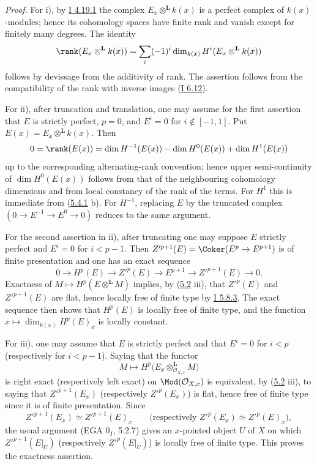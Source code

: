\emph{Proof.} For i), by \hyperlink{sga6.e01.cor.4-19-1}{I 4.19.1} the complex \(E_x\otimes^{\mathbf L}k(x)\) is a perfect complex of \(k(x)\)-modules; hence its cohomology spaces have finite rank and vanish except for finitely many degrees. The identity
\[
 \rank(E_x\otimes^{\mathbf L}k(x))
 =\sum_i(-1)^i\dim_{k(x)}H^i(E_x\otimes^{\mathbf L}k(x))
\]
follows by devissage from the additivity of rank. The assertion follows from the compatibility of the rank with inverse images (\hyperlink{sga6.e01.prop.6-12}{I 6.12}).

For ii), after truncation and translation, one may assume for the first assertion that \(E\) is strictly perfect, \(p=0\), and \(E^i=0\) for \(i\notin[-1,1]\). Put \(E(x)=E_x\otimes^{\mathbf L}k(x)\). Then
\[
 0=\rank(E(x))
 =\dim H^{-1}(E(x))-\dim H^0(E(x))+\dim H^1(E(x))
\]
up to the corresponding alternating-rank convention; hence upper semi-continuity of \(\dim H^0(E(x))\) follows from that of the neighbouring cohomology dimensions and from local constancy of the rank of the terms. For \(H^1\) this is immediate from (\hyperlink{sga6.e03.ex.5-4-1}{5.4.1} b). For \(H^{-1}\), replacing \(E\) by the truncated complex \((0\to E^{-1}\to E^0\to0)\) reduces to the same argument.

For the second assertion in ii), after truncating one may suppose \(E\) strictly perfect and \(E^i=0\) for \(i<p-1\). Then \(Z'^{p+1}(E)=\Coker(E^p\to E^{p+1})\) is of finite presentation and one has an exact sequence
\[
0\to H^p(E)\to Z'^p(E)\to E^{p+1}\to Z'^{p+1}(E)\to0.
\]
Exactness of \(M\mapsto H^p(E\otimes^{\mathbf L}M)\) implies, by (\hyperlink{sga6.e03.rem.5-2}{5.2} iii), that \(Z'^{p}(E)\) and \(Z'^{p+1}(E)\) are flat, hence locally free of finite type by \hyperlink{sga6.e01.lem.5-8-3}{I 5.8.3}. The exact sequence then shows that \(H^p(E)\) is locally free of finite type, and the function \(x\mapsto\dim_{k(x)}H^p(E)_x\) is locally constant.

For iii), one may assume that \(E\) is strictly perfect and that \(E^i=0\) for \(i<p\) (respectively for \(i<p-1\)). Saying that the functor
\[
 M\longmapsto H^p\bigl(E_x\otimes_{\mathcal O_{X,x}}^{\mathbf L}M\bigr)
\]
is right exact (respectively left exact) on \(\Mod(\mathcal O_{X,x})\) is equivalent, by (\hyperlink{sga6.e03.rem.5-2}{5.2} iii), to saying that \(Z'^{p+1}(E_x)\) (respectively \(Z'^p(E_x)\)) is flat, hence free of finite type since it is of finite presentation. Since
\[
 Z'^{p+1}(E_x)\simeq Z'^{p+1}(E)_x
 \qquad\text{(respectively }Z'^p(E_x)\simeq Z'^p(E)_x\text{)},
\]
the usual argument (EGA \(0_I\), 5.2.7) gives an \(x\)-pointed object \(U\) of \(X\) on which \(Z'^{p+1}(E|_U)\) (respectively \(Z'^p(E|_U)\)) is locally free of finite type. This proves the exactness assertion.

